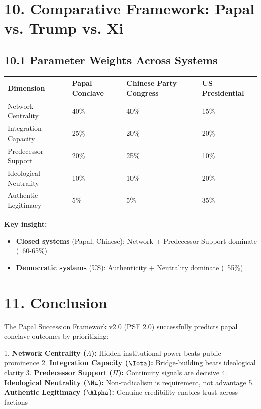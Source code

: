 \section{10. Comparative Framework: Papal vs. Trump vs. Xi}

\subsection{10.1 Parameter Weights Across Systems}

\begin{table}[h]
\centering
\begin{tabular}{|l|l|l|l|}
\hline
\textbf{Dimension} & \textbf{Papal Conclave} & \textbf{Chinese Party Congress} & \textbf{US Presidential} \\
\hline
Network Centrality & 40\% & 40\% & 15\% \\
Integration Capacity & 25\% & 20\% & 20\% \\
Predecessor Support & 20\% & 25\% & 10\% \\
Ideological Neutrality & 10\% & 10\% & 20\% \\
Authentic Legitimacy & 5\% & 5\% & 35\% \\
\hline
\end{tabular}
\end{table}

\textbf{Key insight:}
\begin{itemize}
\item \textbf{Closed systems} (Papal, Chinese): Network + Predecessor Support dominate (~60-65\%)
\item \textbf{Democratic systems} (US): Authenticity + Neutrality dominate (~55\%)
\end{itemize}

\section{11. Conclusion}

The Papal Succession Framework v2.0 (PSF 2.0) successfully predicts papal conclave outcomes by prioritizing:

1. \textbf{Network Centrality ($\Lambda$):} Hidden institutional power beats public prominence
2. \textbf{Integration Capacity ($\Iota$):} Bridge-building beats ideological clarity
3. \textbf{Predecessor Support ($\Pi$):} Continuity signals are decisive
4. \textbf{Ideological Neutrality ($\Nu$):} Non-radicalism is requirement, not advantage
5. \textbf{Authentic Legitimacy ($\Alpha$):} Genuine credibility enables trust across factions

